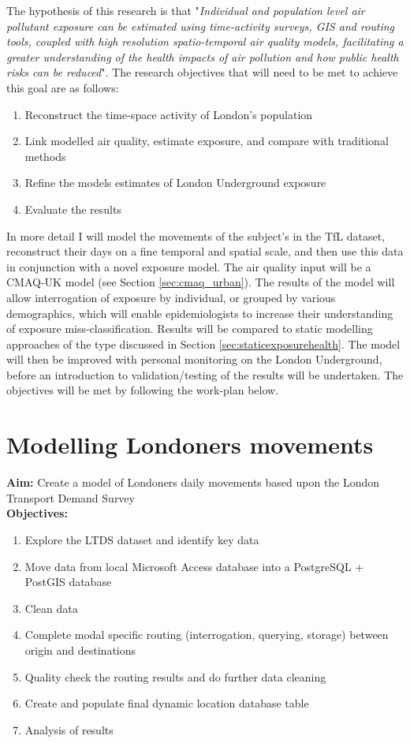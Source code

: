 The hypothesis of this research is that "\textit{Individual and population level air pollutant exposure can be estimated using time-activity surveys, GIS and routing tools, coupled with high resolution spatio-temporal air quality models, facilitating a greater understanding of the health impacts of air pollution and how public health risks can be reduced}". The research objectives that will need to be met to achieve this goal are as follows:

\begin{enumerate}
\item Reconstruct the time-space activity of London's population
\item Link modelled air quality, estimate exposure, and compare with traditional methods
\item Refine the models estimates of London Underground exposure
\item Evaluate the results
\end{enumerate}

In more detail I will model the movements of the subject's in the TfL dataset, reconstruct their days on a fine temporal and spatial scale, and then use this data in conjunction with a novel exposure model. The air quality input will be a CMAQ-UK model (see Section \ref{sec:cmaq_urban}). The results of the model will allow interrogation of exposure by individual, or grouped by various demographics, which will enable epidemiologists to increase their understanding of exposure miss-classification. Results will be compared to static modelling approaches of the type discussed in Section \ref{sec:staticexposurehealth}. The model will then be improved with personal monitoring on the London Underground, before an introduction to validation/testing of the results will be undertaken. The objectives will be met by following the work-plan below.

\section{Modelling Londoners movements}

\textbf{Aim:} Create a model of Londoners daily movements based upon the London Transport Demand Survey \\
\textbf{Objectives:}

\begin{enumerate}
\item Explore the LTDS dataset and identify key data
\item Move data from local Microsoft Access database into a PostgreSQL + PostGIS database
\item Clean data
\item Complete modal specific routing (interrogation, querying, storage) between origin and destinations
\item Quality check the routing results and do further data cleaning
\item Create and populate final dynamic location database table
\item Analysis of results
\end{enumerate}

